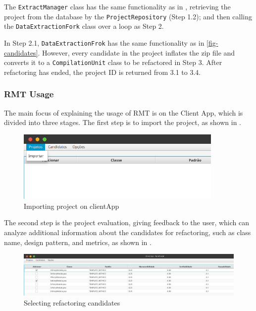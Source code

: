 The \texttt{ExtractManager} class has the same functionality as in , retrieving the project from the database by the \texttt{ProjectRepository} (Step 1.2); and then calling the \texttt{DataExtractionFork} class over a loop as Step 2.

 In Step 2.1, \texttt{DataExtractionFrok} has the same functionality as in \cref{fig-candidates}. However, every candidate in the project inflates the zip file and converts it to a \texttt{CompilationUnit} class to be refactored in Step 3. After refactoring has ended, the project ID is returned from 3.1 to 3.4.

\subsubsection{RMT Usage}
\label{sub-usage}

The main focus of explaining the usage of RMT is on the Client App, which is divided into three stages. The first step is to import the project, as shown in .

\begin{figure}[ht!]
\SetCaptionWidth{\textwidth}
\caption{Importing project on clientApp}
\label{fig-import}
\includegraphics[width =100mm]{Chapter-2/Figures/import.png}
\end{figure}
\FloatBarrier

The second step is the project evaluation, giving feedback to the user, which can analyze additional information about the candidates for refactoring, such as class name, design pattern, and metrics, as shown in .

\begin{figure}[ht!]
\SetCaptionWidth{\textwidth}
\caption{Selecting refactoring candidates}
\label{fig-choose}
\includegraphics[width =\textwidth]{Chapter-2/Figures/choose.png}
\end{figure}
\FloatBarrier

